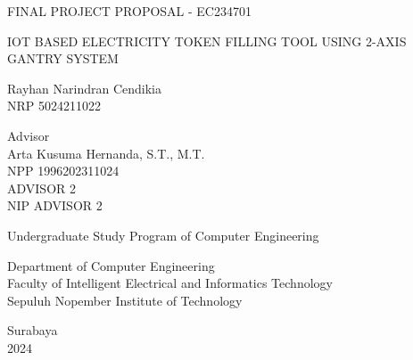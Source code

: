 \begin{large}
  FINAL PROJECT PROPOSAL - EC234701
\end{large}

\vspace{\fill}

\begin{spacing}{1.5}
  \begin{Large}
    IOT BASED ELECTRICITY TOKEN FILLING TOOL USING 2-AXIS GANTRY SYSTEM
  \end{Large}
\end{spacing}

\vspace{\fill}

\begin{large}
  Rayhan Narindran Cendikia \\
  \textmd{NRP 5024211022}
\end{large}

\vspace{\fill}

\begin{large}
  \textmd{Advisor} \\
  Arta Kusuma Hernanda, S.T., M.T. \\
  \textmd{NPP 1996202311024} \\
  ADVISOR 2 \\
  \textmd{NIP ADVISOR 2}
\end{large}

\vspace{\fill}

Undergraduate Study Program of Computer Engineering \\

\mdseries

Department of Computer Engineering \\
Faculty of Intelligent Electrical and Informatics Technology \\
Sepuluh Nopember Institute of Technology

Surabaya \\
2024


